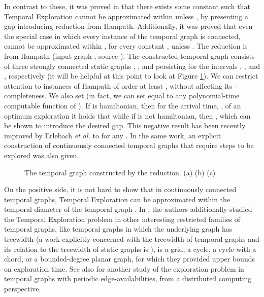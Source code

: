 \documentclass[oribibl, 11pt]{llncs}
\begin{document}
In contrast to these, it was proved in \cite{MS14} that there exists some constant  such that {\sc Temporal Exploration} cannot be approximated within  unless , by presenting a gap introducing reduction from {\sc Hampath}. Additionally, it was proved that even the special case in which every instance of the temporal graph is connected, cannot be approximated within , for every constant , unless . The reduction is from {\sc Hampath} (input graph , source ). The constructed temporal graph  consists of three strongly connected static graphs , , and  persisting for the intervals , , and , respectively (it will be helpful at this point to look at Figure \ref{fig:oneint}). We can restrict attention to instances of {\sc Hampath} of order at least , without affecting its -completeness. We also set  (in fact, we can set  equal to any polynomial-time computable function of ). If  is hamiltonian, then for the arrival time, , of an optimum exploration it holds that  while if  is not hamiltonian, then     , which can be shown to introduce the desired  gap. This negative result has been recently improved by Erlebach \emph{et al.} \cite{EHK15} to  for any . In the same work, an explicit construction of continuously connected temporal graphs that require  steps to be explored was also given. 

\begin{figure}[!hbtp]
   \caption{The temporal graph constructed by the reduction. (a)  (b)  (c) } \label{fig:oneint}
\end{figure}

On the positive side, it is not hard to show that in continuously connected temporal graphs, {\sc Temporal Exploration} can be approximated within the temporal diameter of the temporal graph \cite{MS14}. In \cite{EHK15}, the authors additionally studied the {\sc Temporal Exploration} problem in other interesting restricted families of temporal graphs, like temporal graphs in which the underlying graph has treewidth  (a work explicitly concerned with the treewidth of temporal graphs and its relation to the treewidth of static graphs is \cite{MM13}), is a  grid, a cycle, a cycle with a chord, or a bounded-degree planar graph, for which they provided upper bounds on exploration time. See also \cite{FMS09} for another study of the exploration problem in temporal graphs with periodic edge-availabilities, from a distributed computing perspective.
\end{document}

